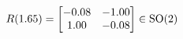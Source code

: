 \documentclass[preview]{standalone}
\begin{document}
\begin{align*}
\special{dvisvgm:raw <g id='unique000'>}R(1.65) = \begin{bmatrix} -0.08 & -1.00 \\ 1.00 & -0.08 \end{bmatrix} \in \text{SO}(2)\special{dvisvgm:raw </g>}
\end{align*}
\end{document}
